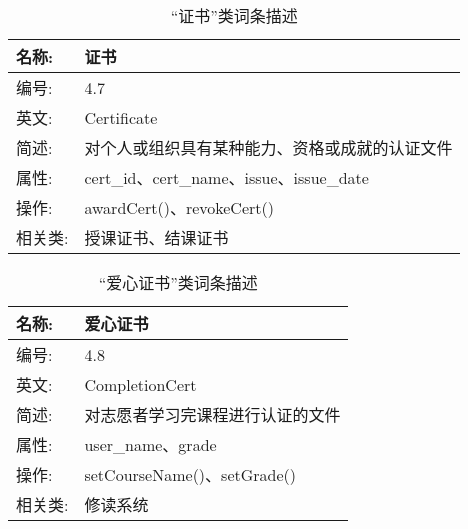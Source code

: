 \begin{table}[H]  
\caption{“证书”类词条描述}  
\begin{center}  
    \begin{tabular}{l p{11cm}} 
        \hline
        \quad 名称:  &  证书 \\
        \hline
        \quad 编号:  & 4.7 \\
        \hline
        \quad 英文:  &  Certificate \\
        \hline
        \quad 简述:  & 对个人或组织具有某种能力、资格或成就的认证文件 \\
        \hline
        \quad 属性:  & cert\_id、cert\_name、issue、issue\_date\\
        \hline
        \quad 操作:  & awardCert()、revokeCert() \\
        \hline
        \quad 相关类:  & 授课证书、结课证书 \\
        \hline
    \end{tabular}
\end{center}
\end{table}

\begin{table}[H]  
\caption{“爱心证书”类词条描述}  
\begin{center}  
    \begin{tabular}{l p{11cm}} 
        \hline
        \quad 名称:  &  爱心证书 \\
        \hline
        \quad 编号:  & 4.8 \\
        \hline
        \quad 英文:  &  CompletionCert \\
        \hline
        \quad 简述:  & 对志愿者学习完课程进行认证的文件 \\
        \hline
        \quad 属性:  & user\_name、grade\\
        \hline
        \quad 操作:  & setCourseName()、setGrade()\\
        \hline
        \quad 相关类:  & 修读系统 \\
        \hline
    \end{tabular}
\end{center}
\end{table}


